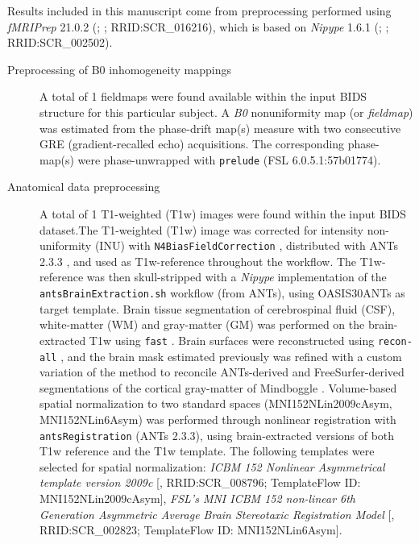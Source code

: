 \documentclass[
]{article}
\author{}
\date{}
\begin{document}
Results included in this manuscript come from preprocessing performed
using \emph{fMRIPrep} 21.0.2 (\citet{fmriprep1}; \citet{fmriprep2};
RRID:SCR\_016216), which is based on \emph{Nipype} 1.6.1
(\citet{nipype1}; \citet{nipype2}; RRID:SCR\_002502).

\begin{description}
\item[Preprocessing of B0 inhomogeneity mappings]
A total of 1 fieldmaps were found available within the input BIDS
structure for this particular subject. A \emph{B0} nonuniformity map (or
\emph{fieldmap}) was estimated from the phase-drift map(s) measure with
two consecutive GRE (gradient-recalled echo) acquisitions. The
corresponding phase-map(s) were phase-unwrapped with \texttt{prelude}
(FSL 6.0.5.1:57b01774).
\item[Anatomical data preprocessing]
A total of 1 T1-weighted (T1w) images were found within the input BIDS
dataset.The T1-weighted (T1w) image was corrected for intensity
non-uniformity (INU) with \texttt{N4BiasFieldCorrection} \citep{n4},
distributed with ANTs 2.3.3 \citep[RRID:SCR\_004757]{ants}, and used as
T1w-reference throughout the workflow. The T1w-reference was then
skull-stripped with a \emph{Nipype} implementation of the
\texttt{antsBrainExtraction.sh} workflow (from ANTs), using OASIS30ANTs
as target template. Brain tissue segmentation of cerebrospinal fluid
(CSF), white-matter (WM) and gray-matter (GM) was performed on the
brain-extracted T1w using \texttt{fast} \citep[FSL 6.0.5.1:57b01774,
RRID:SCR\_002823,][]{fsl_fast}. Brain surfaces were reconstructed using
\texttt{recon-all} \citep[FreeSurfer 6.0.1,
RRID:SCR\_001847,][]{fs_reconall}, and the brain mask estimated
previously was refined with a custom variation of the method to
reconcile ANTs-derived and FreeSurfer-derived segmentations of the
cortical gray-matter of Mindboggle
\citep[RRID:SCR\_002438,][]{mindboggle}. Volume-based spatial
normalization to two standard spaces (MNI152NLin2009cAsym,
MNI152NLin6Asym) was performed through nonlinear registration with
\texttt{antsRegistration} (ANTs 2.3.3), using brain-extracted versions
of both T1w reference and the T1w template. The following templates were
selected for spatial normalization: \emph{ICBM 152 Nonlinear
Asymmetrical template version 2009c} {[}\citet{mni152nlin2009casym},
RRID:SCR\_008796; TemplateFlow ID: MNI152NLin2009cAsym{]}, \emph{FSL's
MNI ICBM 152 non-linear 6th Generation Asymmetric Average Brain
Stereotaxic Registration Model} {[}\citet{mni152nlin6asym},
RRID:SCR\_002823; TemplateFlow ID: MNI152NLin6Asym{]}.

\end{description}
\end{document}
